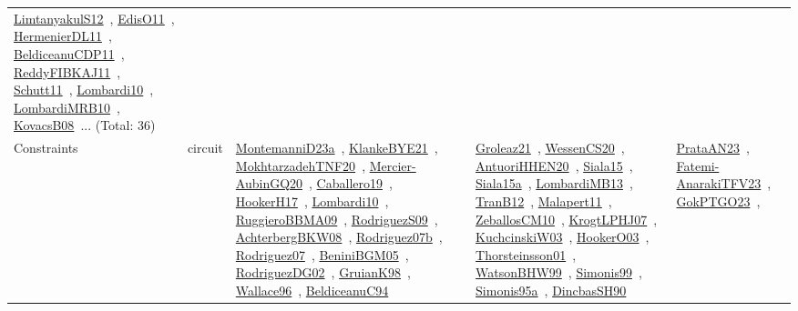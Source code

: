 {\begin{longtable}{lp{3cm}>{\raggedright\arraybackslash}p{6cm}>{\raggedright\arraybackslash}p{6cm}>{\raggedright\arraybackslash}p{8cm}}
\href{../works/LimtanyakulS12.pdf}{LimtanyakulS12}~\cite{LimtanyakulS12}, \href{../works/EdisO11.pdf}{EdisO11}~\cite{EdisO11}, \href{../works/HermenierDL11.pdf}{HermenierDL11}~\cite{HermenierDL11}, \href{../works/BeldiceanuCDP11.pdf}{BeldiceanuCDP11}~\cite{BeldiceanuCDP11}, \href{../works/ReddyFIBKAJ11.pdf}{ReddyFIBKAJ11}~\cite{ReddyFIBKAJ11}, \href{../works/Schutt11.pdf}{Schutt11}~\cite{Schutt11}, \href{../works/Lombardi10.pdf}{Lombardi10}~\cite{Lombardi10}, \href{../works/LombardiMRB10.pdf}{LombardiMRB10}~\cite{LombardiMRB10}, \href{../works/KovacsB08.pdf}{KovacsB08}~\cite{KovacsB08}... (Total: 36)\\
Constraints & circuit & \href{../works/MontemanniD23a.pdf}{MontemanniD23a}~\cite{MontemanniD23a}, \href{../works/KlankeBYE21.pdf}{KlankeBYE21}~\cite{KlankeBYE21}, \href{../works/MokhtarzadehTNF20.pdf}{MokhtarzadehTNF20}~\cite{MokhtarzadehTNF20}, \href{../works/Mercier-AubinGQ20.pdf}{Mercier-AubinGQ20}~\cite{Mercier-AubinGQ20}, \href{../works/Caballero19.pdf}{Caballero19}~\cite{Caballero19}, \href{../works/HookerH17.pdf}{HookerH17}~\cite{HookerH17}, \href{../works/Lombardi10.pdf}{Lombardi10}~\cite{Lombardi10}, \href{../works/RuggieroBBMA09.pdf}{RuggieroBBMA09}~\cite{RuggieroBBMA09}, \href{../works/RodriguezS09.pdf}{RodriguezS09}~\cite{RodriguezS09}, \href{../works/AchterbergBKW08.pdf}{AchterbergBKW08}~\cite{AchterbergBKW08}, \href{../works/Rodriguez07b.pdf}{Rodriguez07b}~\cite{Rodriguez07b}, \href{../works/Rodriguez07.pdf}{Rodriguez07}~\cite{Rodriguez07}, \href{../works/BeniniBGM05.pdf}{BeniniBGM05}~\cite{BeniniBGM05}, \href{../works/RodriguezDG02.pdf}{RodriguezDG02}~\cite{RodriguezDG02}, \href{../works/GruianK98.pdf}{GruianK98}~\cite{GruianK98}, \href{../works/Wallace96.pdf}{Wallace96}~\cite{Wallace96}, \href{../works/BeldiceanuC94.pdf}{BeldiceanuC94}~\cite{BeldiceanuC94} & \href{../works/Groleaz21.pdf}{Groleaz21}~\cite{Groleaz21}, \href{../works/WessenCS20.pdf}{WessenCS20}~\cite{WessenCS20}, \href{../works/AntuoriHHEN20.pdf}{AntuoriHHEN20}~\cite{AntuoriHHEN20}, \href{../works/Siala15.pdf}{Siala15}~\cite{Siala15}, \href{../works/Siala15a.pdf}{Siala15a}~\cite{Siala15a}, \href{../works/LombardiMB13.pdf}{LombardiMB13}~\cite{LombardiMB13}, \href{../works/TranB12.pdf}{TranB12}~\cite{TranB12}, \href{../works/Malapert11.pdf}{Malapert11}~\cite{Malapert11}, \href{../works/ZeballosCM10.pdf}{ZeballosCM10}~\cite{ZeballosCM10}, \href{../works/KrogtLPHJ07.pdf}{KrogtLPHJ07}~\cite{KrogtLPHJ07}, \href{../works/KuchcinskiW03.pdf}{KuchcinskiW03}~\cite{KuchcinskiW03}, \href{../works/HookerO03.pdf}{HookerO03}~\cite{HookerO03}, \href{../works/Thorsteinsson01.pdf}{Thorsteinsson01}~\cite{Thorsteinsson01}, \href{../works/WatsonBHW99.pdf}{WatsonBHW99}~\cite{WatsonBHW99}, \href{../works/Simonis99.pdf}{Simonis99}~\cite{Simonis99}, \href{../works/Simonis95a.pdf}{Simonis95a}~\cite{Simonis95a}, \href{../works/DincbasSH90.pdf}{DincbasSH90}~\cite{DincbasSH90} & \href{../works/PrataAN23.pdf}{PrataAN23}~\cite{PrataAN23}, \href{../works/Fatemi-AnarakiTFV23.pdf}{Fatemi-AnarakiTFV23}~\cite{Fatemi-AnarakiTFV23}, \href{../works/GokPTGO23.pdf}{GokPTGO23}~\cite{GokPTGO23}, 
\end{longtable}}
